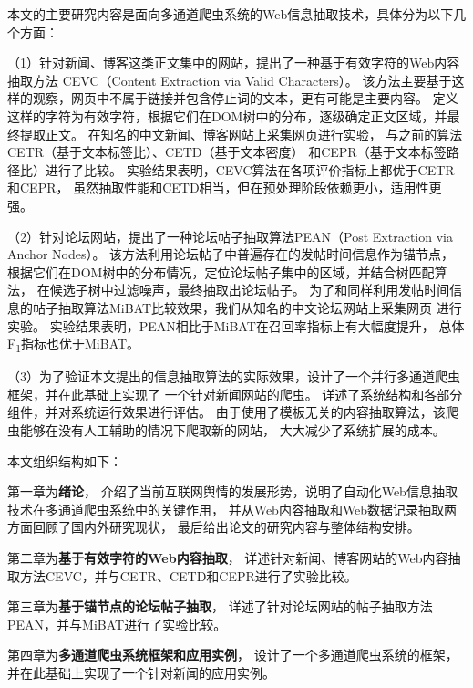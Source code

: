 本文的主要研究内容是面向多通道爬虫系统的Web信息抽取技术，具体分为以下几个方面：

（1）针对新闻、博客这类正文集中的网站，提出了一种基于有效字符的Web内容抽取方法
CEVC（Content Extraction via Valid Characters）。
该方法主要基于这样的观察，网页中不属于链接并包含停止词的文本，更有可能是主要内容。
定义这样的字符为有效字符，根据它们在DOM树中的分布，逐级确定正文区域，并最终提取正文。
在知名的中文新闻、博客网站上采集网页进行实验，
与之前的算法CETR（基于文本标签比）、CETD（基于文本密度）
和CEPR（基于文本标签路径比）进行了比较。
实验结果表明，CEVC算法在各项评价指标上都优于CETR和CEPR，
虽然抽取性能和CETD相当，但在预处理阶段依赖更小，适用性更强。

（2）针对论坛网站，提出了一种论坛帖子抽取算法PEAN（Post Extraction via Anchor Nodes）。
该方法利用论坛帖子中普遍存在的发帖时间信息作为锚节点，
根据它们在DOM树中的分布情况，定位论坛帖子集中的区域，并结合树匹配算法，
在候选子树中过滤噪声，最终抽取出论坛帖子。
为了和同样利用发帖时间信息的帖子抽取算法MiBAT比较效果，我们从知名的中文论坛网站上采集网页
进行实验。
实验结果表明，PEAN相比于MiBAT在召回率指标上有大幅度提升，
总体F\textsubscript{1}指标也优于MiBAT。

（3）为了验证本文提出的信息抽取算法的实际效果，设计了一个并行多通道爬虫框架，并在此基础上实现了
一个针对新闻网站的爬虫。
详述了系统结构和各部分组件，并对系统运行效果进行评估。
由于使用了模板无关的内容抽取算法，该爬虫能够在没有人工辅助的情况下爬取新的网站，
大大减少了系统扩展的成本。

本文组织结构如下：

第一章为\textbf{绪论}，
介绍了当前互联网舆情的发展形势，说明了自动化Web信息抽取技术在多通道爬虫系统中的关键作用，
并从Web内容抽取和Web数据记录抽取两方面回顾了国内外研究现状，
最后给出论文的研究内容与整体结构安排。

第二章为\textbf{基于有效字符的Web内容抽取}，
详述针对新闻、博客网站的Web内容抽取方法CEVC，并与CETR、CETD和CEPR进行了实验比较。

第三章为\textbf{基于锚节点的论坛帖子抽取}，
详述了针对论坛网站的帖子抽取方法PEAN，并与MiBAT进行了实验比较。

第四章为\textbf{多通道爬虫系统框架和应用实例}，
设计了一个多通道爬虫系统的框架，并在此基础上实现了一个针对新闻的应用实例。
